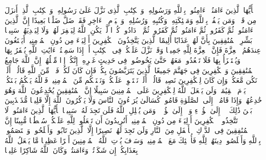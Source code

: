 \stopbuffer%
\startbuffer[\q:4:136]
یَٰۤأَیُّهَا ٱلَّذِینَ ءَامَنُوۤا۟ ءَامِنُوا۟ بِٱللَّهِ وَرَسُولِهِۦ وَٱلۡكِتَٰبِ ٱلَّذِی نَزَّلَ عَلَىٰ رَسُولِهِۦ وَٱلۡكِتَٰبِ ٱلَّذِیۤ أَنزَلَ مِن قَبۡلُۚ وَمَن یَكۡفُرۡ بِٱللَّهِ وَمَلَٰۤئِكَتِهِۦ وَكُتُبِهِۦ وَرُسُلِهِۦ وَٱلۡیَوۡمِ ٱلۡءَاخِرِ فَقَدۡ ضَلَّ ضَلَٰلَۢا بَعِیدًا%
\stopbuffer%
\startbuffer[\q:4:137]
إِنَّ ٱلَّذِینَ ءَامَنُوا۟ ثُمَّ كَفَرُوا۟ ثُمَّ ءَامَنُوا۟ ثُمَّ كَفَرُوا۟ ثُمَّ ٱزۡدَادُوا۟ كُفۡرࣰا لَّمۡ یَكُنِ ٱللَّهُ لِیَغۡفِرَ لَهُمۡ وَلَا لِیَهۡدِیَهُمۡ سَبِیلَۢا%
\stopbuffer%
\startbuffer[\q:4:138]
بَشِّرِ ٱلۡمُنَٰفِقِینَ بِأَنَّ لَهُمۡ عَذَابًا أَلِیمًا%
\stopbuffer%
\startbuffer[\q:4:139]
ٱلَّذِینَ یَتَّخِذُونَ ٱلۡكَٰفِرِینَ أَوۡلِیَاۤءَ مِن دُونِ ٱلۡمُؤۡمِنِینَۚ أَیَبۡتَغُونَ عِندَهُمُ ٱلۡعِزَّةَ فَإِنَّ ٱلۡعِزَّةَ لِلَّهِ جَمِیعࣰا%
\stopbuffer%
\startbuffer[\q:4:140]
وَقَدۡ نَزَّلَ عَلَیۡكُمۡ فِی ٱلۡكِتَٰبِ أَنۡ إِذَا سَمِعۡتُمۡ ءَایَٰتِ ٱللَّهِ یُكۡفَرُ بِهَا وَیُسۡتَهۡزَأُ بِهَا فَلَا تَقۡعُدُوا۟ مَعَهُمۡ حَتَّىٰ یَخُوضُوا۟ فِی حَدِیثٍ غَیۡرِهِۦۤ إِنَّكُمۡ إِذࣰا مِّثۡلُهُمۡۗ إِنَّ ٱللَّهَ جَامِعُ ٱلۡمُنَٰفِقِینَ وَٱلۡكَٰفِرِینَ فِی جَهَنَّمَ جَمِیعًا%
\stopbuffer%
\startbuffer[\q:4:141]
ٱلَّذِینَ یَتَرَبَّصُونَ بِكُمۡ فَإِن كَانَ لَكُمۡ فَتۡحࣱ مِّنَ ٱللَّهِ قَالُوۤا۟ أَلَمۡ نَكُن مَّعَكُمۡ وَإِن كَانَ لِلۡكَٰفِرِینَ نَصِیبࣱ قَالُوۤا۟ أَلَمۡ نَسۡتَحۡوِذۡ عَلَیۡكُمۡ وَنَمۡنَعۡكُم مِّنَ ٱلۡمُؤۡمِنِینَۚ فَٱللَّهُ یَحۡكُمُ بَیۡنَكُمۡ یَوۡمَ ٱلۡقِیَٰمَةِۗ وَلَن یَجۡعَلَ ٱللَّهُ لِلۡكَٰفِرِینَ عَلَى ٱلۡمُؤۡمِنِینَ سَبِیلًا%
\stopbuffer%
\startbuffer[\q:4:142]
إِنَّ ٱلۡمُنَٰفِقِینَ یُخَٰدِعُونَ ٱللَّهَ وَهُوَ خَٰدِعُهُمۡ وَإِذَا قَامُوۤا۟ إِلَى ٱلصَّلَوٰةِ قَامُوا۟ كُسَالَىٰ یُرَاۤءُونَ ٱلنَّاسَ وَلَا یَذۡكُرُونَ ٱللَّهَ إِلَّا قَلِیلࣰا%
\stopbuffer%
\startbuffer[\q:4:143]
مُّذَبۡذَبِینَ بَیۡنَ ذَٰلِكَ لَاۤ إِلَىٰ هَٰۤؤُلَاۤءِ وَلَاۤ إِلَىٰ هَٰۤؤُلَاۤءِۚ وَمَن یُضۡلِلِ ٱللَّهُ فَلَن تَجِدَ لَهُۥ سَبِیلࣰا%
\stopbuffer%
\startbuffer[\q:4:144]
یَٰۤأَیُّهَا ٱلَّذِینَ ءَامَنُوا۟ لَا تَتَّخِذُوا۟ ٱلۡكَٰفِرِینَ أَوۡلِیَاۤءَ مِن دُونِ ٱلۡمُؤۡمِنِینَۚ أَتُرِیدُونَ أَن تَجۡعَلُوا۟ لِلَّهِ عَلَیۡكُمۡ سُلۡطَٰنࣰا مُّبِینًا%
\stopbuffer%
\startbuffer[\q:4:145]
إِنَّ ٱلۡمُنَٰفِقِینَ فِی ٱلدَّرۡكِ ٱلۡأَسۡفَلِ مِنَ ٱلنَّارِ وَلَن تَجِدَ لَهُمۡ نَصِیرًا%
\stopbuffer%
\startbuffer[\q:4:146]
إِلَّا ٱلَّذِینَ تَابُوا۟ وَأَصۡلَحُوا۟ وَٱعۡتَصَمُوا۟ بِٱللَّهِ وَأَخۡلَصُوا۟ دِینَهُمۡ لِلَّهِ فَأُو۟لَٰۤئِكَ مَعَ ٱلۡمُؤۡمِنِینَۖ وَسَوۡفَ یُؤۡتِ ٱللَّهُ ٱلۡمُؤۡمِنِینَ أَجۡرًا عَظِیمࣰا%
\stopbuffer%
\startbuffer[\q:4:147]
مَّا یَفۡعَلُ ٱللَّهُ بِعَذَابِكُمۡ إِن شَكَرۡتُمۡ وَءَامَنتُمۡۚ وَكَانَ ٱللَّهُ شَاكِرًا عَلِیمࣰا%
\stopbuffer%
